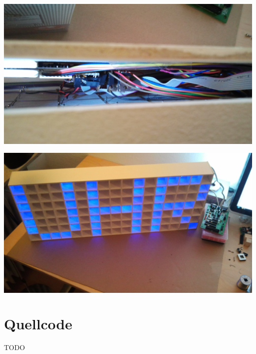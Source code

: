 %
\newpage
\centerline{\includegraphics[width=\linewidth]{images/gehaeuse7.jpg}}
\label{fig_gehaeuse7}
\vfill
\centerline{\includegraphics[width=\linewidth]{images/gehaeuse8.jpg}}
\label{fig_gehaeuse8}
%
\newpage
\section{Quellcode}
TODO
